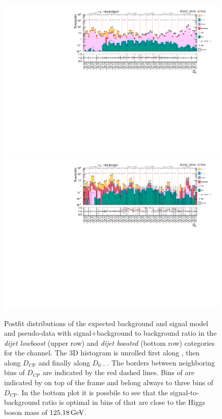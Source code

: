 \begin{figure}[h!]
    \centering 
        \includegraphics[width=\textwidth]{Figures/statana/Postfit_JEC_mela3D/postfit_fit_s_htt_tt_3_13TeV.pdf}
        \includegraphics[width=\textwidth]{Figures/statana/Postfit_JEC_mela3D/postfit_fit_s_htt_tt_4_13TeV.pdf}     
    \caption[Unrolled postfit distributions in the \textit{dijet lowboost} and \textit{dijet boosted} category in the \tautau{} channel.]{Postfit distributions of the expected background and signal model and pseudo-data with signal+background to background ratio in the \textit{dijet lowboost} (upper row) and \textit{dijet boosted} (bottom row) categories for the \tautau{} channel.
    The 3D histogram is unrolled first along \msv, then along $D_\text{CP}$ and finally along $D_{0-}$. The borders between neighboring bins of $D_\text{CP}$ are indicated by the red dashed lines. Bins of \msv{} are indicated by on top of the frame and belong always to three bins of $D_\text{CP}$.
    In the bottom plot it is possbile to see that the signal-to-background ratio is optimal in bins of \msv{} that are close to the Higgs boson mass of $\text{125.18\,GeV}$. }\label{SA:tt_postfit_2jet}
\end{figure}%

